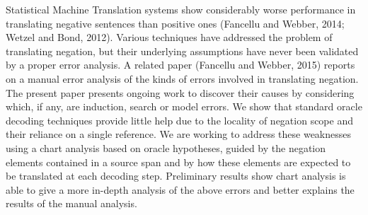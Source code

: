 Statistical Machine Translation systems show considerably worse performance in translating negative sentences than positive ones (Fancellu and Webber, 2014; Wetzel and Bond, 2012). Various techniques have addressed the problem of translating negation, but their underlying assumptions have never been validated by a proper error analysis. A related paper (Fancellu and Webber, 2015) reports on a manual error analysis of the kinds of errors involved in translating negation. The present paper presents ongoing work to discover their causes by considering which, if any, are induction, search or model errors. We show that standard oracle decoding techniques provide little help due to the locality of negation scope and their reliance on a single reference. We are working to address these weaknesses using a chart analysis based on oracle hypotheses, guided by the negation elements contained in a source span and by how these elements are expected to be translated at each decoding step. Preliminary results show chart analysis is able to give a more in-depth analysis of the above errors and better explains the results of the manual analysis.

